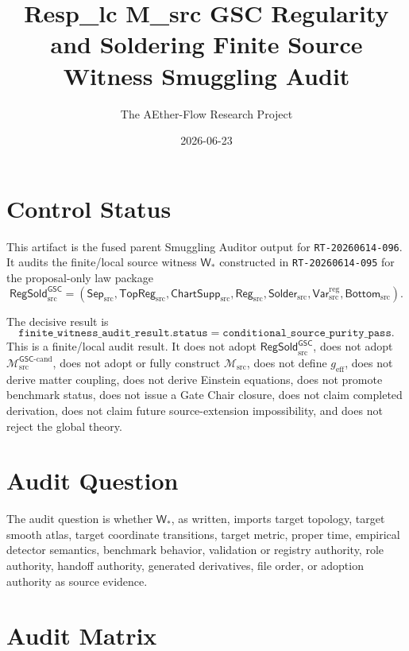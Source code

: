 \documentclass[11pt]{article}
\title{Resp\_lc M\_src GSC Regularity and Soldering Finite Source Witness Smuggling Audit}
\author{The AEther-Flow Research Project}
\date{2026-06-23}
\newcommand{\Msrc}{\mathcal{M}_{\mathrm{src}}}
\newcommand{\Mgsccand}{\mathcal{M}_{\mathrm{src}}^{\mathsf{GSC}\text{-}\mathrm{cand}}}
\newcommand{\geff}{g_{\mathrm{eff}}}
\newcommand{\RegSold}{\mathsf{RegSold}_{\mathrm{src}}^{\mathsf{GSC}}}
\newcommand{\SepSrc}{\mathsf{Sep}_{\mathrm{src}}}
\newcommand{\TopRegSrc}{\mathsf{TopReg}_{\mathrm{src}}}
\newcommand{\ChartSuppSrc}{\mathsf{ChartSupp}_{\mathrm{src}}}
\newcommand{\RegSrc}{\mathsf{Reg}_{\mathrm{src}}}
\newcommand{\SolderSrc}{\mathsf{Solder}_{\mathrm{src}}}
\newcommand{\VarRegSrc}{\mathsf{Var}^{\mathrm{reg}}_{\mathrm{src}}}
\newcommand{\BottomSrc}{\mathsf{Bottom}_{\mathrm{src}}}
\begin{document}
\maketitle

\section*{Control Status}

This artifact is the fused parent Smuggling Auditor output for
\texttt{RT-20260614-096}. It audits the finite/local source witness
\(\mathsf{W}_*\) constructed in \texttt{RT-20260614-095} for the proposal-only
law package
\[
  \RegSold =
  (\SepSrc,\TopRegSrc,\ChartSuppSrc,\RegSrc,\SolderSrc,\VarRegSrc,\BottomSrc).
\]

The decisive result is
\[
  \texttt{finite\_witness\_audit\_result.status}
  =
  \texttt{conditional\_source\_purity\_pass}.
\]
This is a finite/local audit result. It does not adopt \(\RegSold\), does not
adopt \(\Mgsccand\), does not adopt or fully construct \(\Msrc\), does not
define \(\geff\), does not derive matter coupling, does not derive Einstein
equations, does not promote benchmark status, does not issue a Gate Chair
closure, does not claim completed derivation, does not claim future
source-extension impossibility, and does not reject the global theory.

\section{Audit Question}

The audit question is whether \(\mathsf{W}_*\), as written, imports target
topology, target smooth atlas, target coordinate transitions, target metric,
proper time, empirical detector semantics, benchmark behavior, validation or
registry authority, role authority, handoff authority, generated derivatives,
file order, or adoption authority as source evidence.

\section{Audit Matrix}
\end{document}
